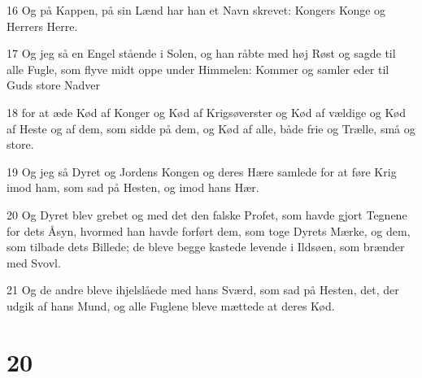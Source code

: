 \par 16 Og på Kappen, på sin Lænd har han et Navn skrevet: Kongers Konge og Herrers Herre.
\par 17 Og jeg så en Engel stående i Solen, og han råbte med høj Røst og sagde til alle Fugle, som flyve midt oppe under Himmelen: Kommer og samler eder til Guds store Nadver
\par 18 for at æde Kød af Konger og Kød af Krigsøverster og Kød af vældige og Kød af Heste og af dem, som sidde på dem, og Kød af alle, både frie og Trælle, små og store.
\par 19 Og jeg så Dyret og Jordens Kongen og deres Hære samlede for at føre Krig imod ham, som sad på Hesten, og imod hans Hær.
\par 20 Og Dyret blev grebet og med det den falske Profet, som havde gjort Tegnene for dets Åsyn, hvormed han havde forført dem, som toge Dyrets Mærke, og dem, som tilbade dets Billede; de bleve begge kastede levende i Ildsøen, som brænder med Svovl.
\par 21 Og de andre bleve ihjelslåede med hans Sværd, som sad på Hesten, det, der udgik af hans Mund, og alle Fuglene bleve mættede at deres Kød.

\chapter{20}

